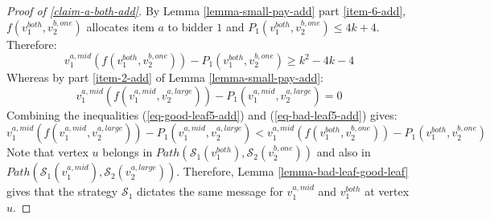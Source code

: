 


\begin{proof}[Proof of \cref{claim-a-both-add}]
            By Lemma \ref{lemma-small-pay-add} part \ref{item-6-add}, $f(v_1^{both},v_2^{b,one})$ allocates item $a$ to bidder $1$ and $P_1(v_1^{both},\allowbreak v_2^{b,one})\le 4k+4$. Therefore:
\begin{equation}\label{eq-good-leaf5-add}
 v_1^{a,mid}(f(v_1^{both},v_2^{b,one}))-P_1(v_1^{both},v_2^{b,one})\ge k^2-4k-4   
\end{equation}
Whereas by part \ref{item-2-add} of Lemma \ref{lemma-small-pay-add}: 
 \begin{equation}\label{eq-bad-leaf5-add}
 v_1^{a,mid}(f(v_1^{a,mid},v_2^{a,large}))-P_1(v_1^{a,mid},v_2^{a,large})=0   
\end{equation}
Combining the inequalities (\ref{eq-good-leaf5-add}) and (\ref{eq-bad-leaf5-add}) gives:
\begin{equation*}
 v_1^{a,mid}(f(v_1^{a,mid},v_2^{a,large}))-P_1(v_1^{a,mid},v_2^{a,large})< 
 v_1^{a,mid}(f(v_1^{both},v_2^{b,one}))-P_1(v_1^{both},v_2^{b,one})
\end{equation*}
Note that vertex $u$ belongs in $Path(\mathcal S_1(v_1^{both}),\mathcal S_2(v_2^{b,one}))$ and also in
$Path(\mathcal{S}_1(v_1^{a,mid}),\allowbreak\mathcal{S}_2(v_2^{a,large}))$. Therefore, Lemma \ref{lemma-bad-leaf-good-leaf} gives that the strategy $\mathcal S_1$ dictates the same message for  $v_1^{a,mid}$ and $v_1^{both}$ at vertex $u$.
\end{proof}
